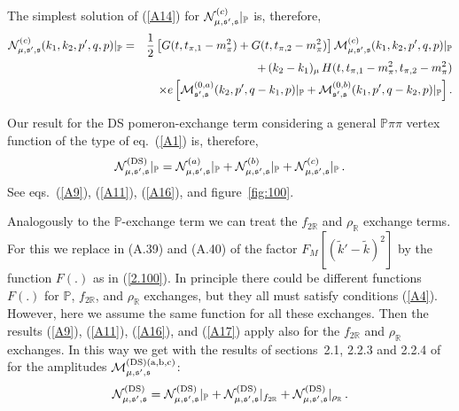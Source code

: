 \documentclass[a4paper,11pt]{article}
\newcommand{\nn}{\nonumber}
\newcommand{\Pom}{\mathbb{P}}
\newcommand{\Reg}{\mathbb{R}}
\begin{document}
The simplest solution of (\ref{A14}) for 
${\cal N}^{(c)}_{\mu, \mathfrak{s'},\mathfrak{s}}|_{\Pom}$ is,
therefore,
%
\begin{eqnarray}
{\cal N}^{(c)}_{\mu, \mathfrak{s'},\mathfrak{s}}(k_{1},k_{2},p',q,p)|_{\Pom} &=&
\frac{1}{2} \left[ 
G(t,t_{\pi,1}-m_{\pi}^{2}) +
G(t,t_{\pi,2}-m_{\pi}^{2}) \right]
{\cal M}^{(c)}_{\mu, \mathfrak{s'},\mathfrak{s}}(k_{1},k_{2},p',q,p)|_{\Pom}\nn  
\\
&&+ \,(k_{2} - k_{1})_{\mu}\,
H(t,t_{\pi,1}-m_{\pi}^{2},t_{\pi,2}-m_{\pi}^{2}) \nn  \\
&&\times
e \left[
{\cal M}^{(0,a)}_{\mathfrak{s'},\mathfrak{s}}(k_{2},p',q-k_{1},p)|_{\Pom}
+ {\cal M}^{(0,b)}_{\mathfrak{s'},\mathfrak{s}}(k_{1},p',q-k_{2},p)|_{\Pom}
\right]. \nn \\
\label{A16}
\end{eqnarray}
%

Our result for the DS pomeron-exchange term considering a general
$\Pom \pi \pi$ vertex function of the type of eq.~(\ref{A1}) is,
therefore,
%
\begin{eqnarray}
{\cal N}^{(\rm DS)}_{\mu, \mathfrak{s'},\mathfrak{s}}|_{\Pom} =
{\cal N}^{(a)}_{\mu, \mathfrak{s'},\mathfrak{s}}|_{\Pom} +
{\cal N}^{(b)}_{\mu, \mathfrak{s'},\mathfrak{s}}|_{\Pom} + 
{\cal N}^{(c)}_{\mu, \mathfrak{s'},\mathfrak{s}}|_{\Pom}\,.
\label{A17}
\end{eqnarray}
%
See eqs.~(\ref{A9}), (\ref{A11}), (\ref{A16}), and figure~\ref{fig:100}.

Analogously to the $\Pom$-exchange term we can treat the $f_{2 \Reg}$
and $\rho_{\Reg}$ exchange terms.
For this we replace in (A.39) and (A.40) of \cite{Lebiedowicz:2025xob} 
the factor $F_{M}[(\tilde{k}'-\tilde{k})^{2}]$ 
by the function $F(.)$ as in (\ref{2.100}).
In principle there could be different functions $F(.)$
for $\Pom$, $f_{2 \Reg}$, and $\rho_{\Reg}$ exchanges,
but they all must satisfy conditions (\ref{A4}).
However, here we assume the same function for all these exchanges.
Then the results (\ref{A9}), (\ref{A11}), (\ref{A16}), and (\ref{A17})
apply also for the $f_{2 \Reg}$ and $\rho_{\Reg}$ exchanges.
In this way we get with 
the results of sections~2.1, 2.2.3 and 2.2.4 of \cite{Lebiedowicz:2025xob}
for the amplitudes
${\cal M}^{(\rm DS) (a,b,c)}_{\mu, \mathfrak{s'},\mathfrak{s}}$:
%
\begin{eqnarray}
{\cal N}^{(\rm DS)}_{\mu, \mathfrak{s'},\mathfrak{s}} =
{\cal N}^{(\rm DS)}_{\mu, \mathfrak{s'},\mathfrak{s}}|_{\Pom} +
{\cal N}^{(\rm DS)}_{\mu, \mathfrak{s'},\mathfrak{s}}|_{f_{2 \Reg}} + 
{\cal N}^{(\rm DS)}_{\mu, \mathfrak{s'},\mathfrak{s}}|_{\rho_{\Reg}}\,.
\label{2.17a}
\end{eqnarray}
%
\end{document}

